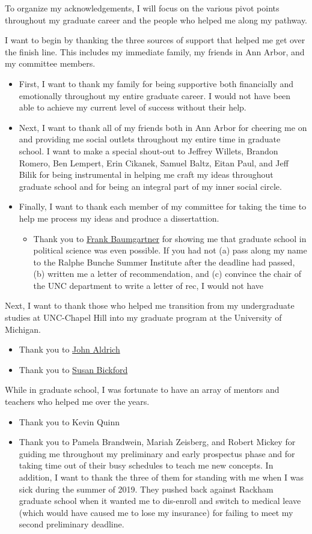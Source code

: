 To organize my acknowledgements, I will focus on the various pivot points throughout my graduate career and the people who helped me along my pathway.

I want to begin by thanking the three sources of support that helped me get over the finish line. This includes my immediate family, my friends in Ann Arbor, and my committee members. 
\begin{itemize}
    \item  First, I want to thank my family for being supportive both financially and emotionally throughout my entire graduate career. I would not have been able to achieve my current level of success without their help. 
    \item Next, I want to thank all of my friends both in Ann Arbor for cheering me on and providing me social outlets throughout my entire time in graduate school. I want to make a special shout-out to Jeffrey Willets, Brandon Romero, Ben Lempert, Erin Cikanek, Samuel Baltz, Eitan Paul, and Jeff Bilik for being instrumental in helping me craft my ideas throughout graduate school and for being an integral part of my inner social circle.
    \item Finally, I want to thank each member of my committee for taking the time to help me process my ideas and produce a dissertattion. 
    \begin{itemize}
        \item Thank you to \href{}{Frank Baumgartner} for showing me that graduate school in political science was even possible. If you had not (a) pass along my name to the Ralphe Bunche Summer Institute after the deadline had passed, (b) written me a letter of recommendation, and (c) convince the chair of the UNC department to write a letter of rec, I would not have 
    \end{itemize}
\end{itemize}
 

Next, I want to thank those who helped me transition from my undergraduate studies at UNC-Chapel Hill into my graduate program at the University of Michigan. 
\begin{itemize}
    \item Thank you to \href{}{John Aldrich}
    \item Thank you to \href{}{Susan Bickford}
\end{itemize}


While in graduate school, I was fortunate to have an array of mentors and teachers who helped me over the years.
\begin{itemize}
    \item Thank you to Kevin Quinn 
    \item Thank you to Pamela Brandwein, Mariah Zeisberg, and Robert Mickey for guiding me throughout my preliminary and early prospectus phase and for taking time out of their busy schedules to teach me new concepts. In addition, I want to thank the three of them for standing with me when I was sick during the summer of 2019. They pushed back against Rackham graduate school when it wanted me to dis-enroll and switch to medical leave (which would have caused me to lose my insurance) for failing to meet my second preliminary deadline. 
    
\end{itemize}

